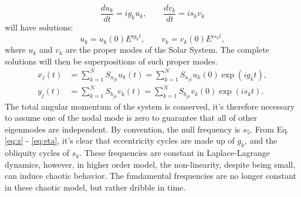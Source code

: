 \documentclass[12pt]{article}
\begin{document}
	\begin{equation}
	\frac{d u_k}{dt} = ig_k u_k, \qquad \frac{d v_k}{dt} = is_k v_k 
	\end{equation}
	will have solutions:
	\begin{equation}
	u_k = u_k(0)E^{i g_k t}, \qquad v_k = v_k(0)E^{i s_k t},
	\end{equation}
	where $u_k$ and $v_k$ are the proper modes of the Solar System. The complete solutions will then be superpositions of such proper modes.
	\begin{align} \label{eq:z}
	x_j(t) &= \sum_{k=1}^{N} {S}_{a_{jk}} u_k(t) = \sum_{k=1}^{N} {S}_{a_{jk}} u_k(0)\exp(i g_k t), \\
	y_j(t) &= \sum_{k=1}^{N} {S}_{b_{jk}} v_k(t)= \sum_{k=1}^{N} {S}_{b_{jk}} v_k(0)\exp(i s_k t). \label{eq:eta} 
	\end{align}
	The total angular momentum of the system is conserved, it's therefore necessary to assume one of the nodal mode is zero to guarantee that all of other eigenmodes are independent. By convention, the null frequency is $s_5$. From Eq. \ref{eq:z} - \ref{eq:eta}, it's clear that eccentricity cycles are made up of $g_k$, and the obliquity cycles of $s_k$. These frequencies are constant in Laplace-Lagrange dynamics, however, in higher order model, the non-linearity, despite being small, can induce chaotic behavior. The fundamental frequencies are no longer constant in these chaotic model, but rather dribble in time.
\end{document}
